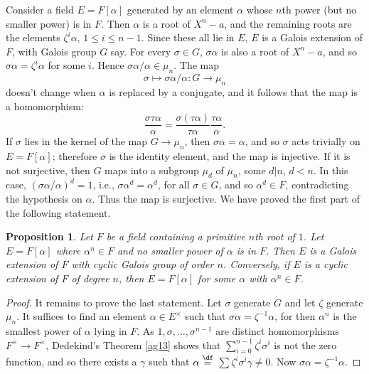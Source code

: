 \documentclass[a4paper,11pt,final,openany]{memoir}
\newtheorem{proposition}[X]{Proposition}
\theoremstyle{nonumberplain}
\newtheorem{proof}{Proof.}
\begin{document}
Consider a field $E=F[\alpha]$ generated by an element $\alpha$ whose $n$th
power (but no smaller power) is in $F$. Then $\alpha$ is a root of $X^{n}-a$,
and the remaining roots are the elements $\zeta^{i}\alpha$, $1\leq i\leq n-1$.
Since these all lie in $E$, $E$ is a Galois extension of $F$, with Galois
group $G$ say. For every $\sigma\in G$, $\sigma\alpha$ is also a root of
$X^{n}-a$, and so $\sigma\alpha=\zeta^{i}\alpha$ for some $i$. Hence
$\sigma\alpha/\alpha\in\mu_{n}$. The map
\[
\sigma\mapsto\sigma\alpha/\alpha\colon G\rightarrow\mu_{n}%
\]
doesn't change when $\alpha$ is replaced by a conjugate, and it follows that
the map is a homomorphism:%
\[
\frac{\sigma\tau\alpha}{\alpha}=\frac{\sigma(\tau\alpha)}{\tau\alpha}%
\frac{\tau\alpha}{\alpha}.
\]
If $\sigma$ lies in the kernel of the map $G\rightarrow\mu_{n}$, then
$\sigma\alpha=\alpha$, and so $\sigma$ acts trivially on $E=F[\alpha]$;
therefore $\sigma$ is the identity element, and the map is injective. If it is
not surjective, then $G$ maps into a subgroup $\mu_{d}$ of $\mu_{n}$, some
$d|n$, $d<n$. In this case, $(\sigma\alpha/\alpha)^{d}=1$, i.e., $\sigma
\alpha^{d}=\alpha^{d}$, for all $\sigma\in G$, and so $\alpha^{d}\in F$,
contradicting the hypothesis on $\alpha$. Thus the map is surjective. We have
proved the first part of the following statement.

\begin{proposition}
\label{ag19b} Let $F$ be a field containing a primitive $n$th root of $1$. Let
$E=F[\alpha]$ where $\alpha^{n}\in F$ and no smaller power of $\alpha$ is in
$F$. Then $E$ is a Galois extension of $F$ with cyclic Galois group of order
$n$. Conversely, if $E$ is a cyclic extension of $F$ of degree $n$, then
$E=F[\alpha]$ for some $\alpha$ with $\alpha^{n}\in F$.
\end{proposition}

\begin{proof}
It remains to prove the last statement. Let $\sigma$ generate $G$ and let
$\zeta$ generate $\mu_{n}$. It suffices to find an element $\alpha\in
E^{\times}$ such that $\sigma\alpha=\zeta^{-1}\alpha$, for then $\alpha^{n}$
is the smallest power of $\alpha$ lying in $F$. As $1,\sigma,\ldots
,\sigma^{n-1}$ are distinct homomorphisms $F^{\times}\rightarrow F^{\times}$,
Dedekind's Theorem \ref{ag13} shows that $\sum_{i=0}^{n-1}\zeta^{i}\sigma^{i}$
is not the zero function, and so there exists a $\gamma$ such that
$\alpha\overset{\df}{=}$ $\sum\zeta^{i}\sigma^{i}\gamma\neq
0$. Now $\sigma\alpha=\zeta^{-1}\alpha$.
\end{proof}
\end{document}
